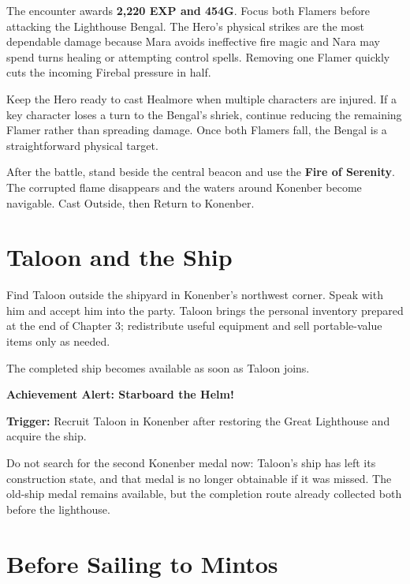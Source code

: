\documentclass[
  american,
  10pt,
  letterpaper,
  oneside,
  open=any]{scrreprt}
\begin{document}
The encounter awards \textbf{2,220 EXP and 454G}. Focus both Flamers
before attacking the Lighthouse Bengal. The Hero's physical strikes are
the most dependable damage because Mara avoids ineffective fire magic
and Nara may spend turns healing or attempting control spells. Removing
one Flamer quickly cuts the incoming Firebal pressure in half.

Keep the Hero ready to cast Healmore when multiple characters are
injured. If a key character loses a turn to the Bengal's shriek,
continue reducing the remaining Flamer rather than spreading damage.
Once both Flamers fall, the Bengal is a straightforward physical target.

After the battle, stand beside the central beacon and use the
\textbf{Fire of Serenity}. The corrupted flame disappears and the waters
around Konenber become navigable. Cast Outside, then Return to Konenber.

\section{Taloon and the Ship}\label{taloon-and-the-ship}

Find Taloon outside the shipyard in Konenber's northwest corner. Speak
with him and accept him into the party. Taloon brings the personal
inventory prepared at the end of Chapter 3; redistribute useful
equipment and sell portable-value items only as needed.

The completed ship becomes available as soon as Taloon joins.

\begin{achievementalert}

\textbf{Achievement Alert: Starboard the Helm!}

\textbf{Trigger:} Recruit Taloon in Konenber after restoring the Great
Lighthouse and acquire the ship.

\end{achievementalert}

Do not search for the second Konenber medal now: Taloon's ship has left
its construction state, and that medal is no longer obtainable if it was
missed. The old-ship medal remains available, but the completion route
already collected both before the lighthouse.

\section{Before Sailing to Mintos}\label{before-sailing-to-mintos}
\end{document}
